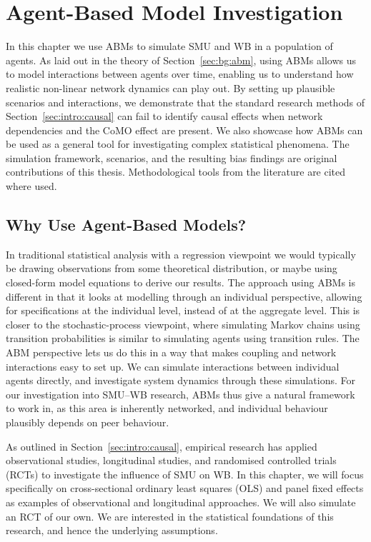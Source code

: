 
\chapter{Agent-Based Model Investigation}
\label{chap:abm}
In this chapter we use ABMs to simulate SMU and WB in a population of agents. As laid out in the theory of Section~\ref{sec:bg:abm}, using ABMs allows us to model interactions between agents over time, enabling us to understand how realistic non-linear network dynamics can play out. By setting up plausible scenarios and interactions, we demonstrate that the standard research methods of Section~\ref{sec:intro:causal} can fail to identify causal effects when network dependencies and the CoMO effect are present. We also showcase how ABMs can be used as a general tool for investigating complex statistical phenomena. The simulation framework, scenarios, and the resulting bias findings are original contributions of this thesis. Methodological tools from the literature are cited where used.

\section{Why Use Agent-Based Models?}
\label{sec:abm:motivation}
In traditional statistical analysis with a regression viewpoint we would typically be drawing observations from some theoretical distribution, or maybe using closed-form model equations to derive our results. The approach using ABMs is different in that it looks at modelling through an individual perspective, allowing for specifications at the individual level, instead of at the aggregate level. This is closer to the stochastic-process viewpoint, where simulating Markov chains using transition probabilities is similar to simulating agents using transition rules. The ABM perspective lets us do this in a way that makes coupling and network interactions easy to set up. We can simulate interactions between individual agents directly, and investigate system dynamics through these simulations. For our investigation into SMU--WB research, ABMs thus give a natural framework to work in, as this area is inherently networked, and individual behaviour plausibly depends on peer behaviour.

As outlined in Section~\ref{sec:intro:causal}, empirical research has applied observational studies, longitudinal studies, and randomised controlled trials (RCTs) to investigate the influence of SMU on WB\@. In this chapter, we will focus specifically on cross-sectional ordinary least squares (OLS) and panel fixed effects as examples of observational and longitudinal approaches. We will also simulate an RCT of our own. We are interested in the statistical foundations of this research, and hence the underlying assumptions.

